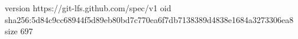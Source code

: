 version https://git-lfs.github.com/spec/v1
oid sha256:5d84c9cc68944f5d89eb80bd7c770ea6f7db7138389d4838e1684a3273306ea8
size 697
